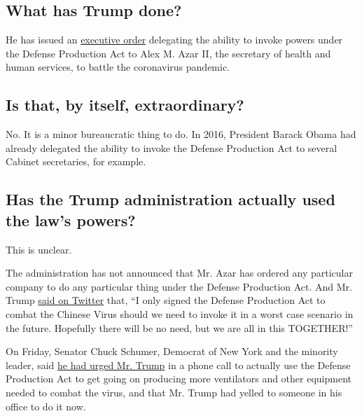 \hypertarget{what-has-trump-done}{%
\subsection{What has Trump done?}\label{what-has-trump-done}}

He has issued an
\href{https://www.whitehouse.gov/presidential-actions/executive-order-prioritizing-allocating-health-medical-resources-respond-spread-covid-19/}{executive
order} delegating the ability to invoke powers under the Defense
Production Act to Alex M. Azar II, the secretary of health and human
services, to battle the coronavirus pandemic.

\hypertarget{is-that-by-itself-extraordinary}{%
\subsection{Is that, by itself,
extraordinary?}\label{is-that-by-itself-extraordinary}}

No. It is a minor bureaucratic thing to do. In 2016, President Barack
Obama had already delegated the ability to invoke the Defense Production
Act to several Cabinet secretaries, for example.

\hypertarget{has-the-trump-administration-actually-used-the-laws-powers}{%
\subsection{Has the Trump administration actually used the law's
powers?}\label{has-the-trump-administration-actually-used-the-laws-powers}}

This is unclear.

The administration has not announced that Mr. Azar has ordered any
particular company to do any particular thing under the Defense
Production Act. And Mr. Trump
\href{https://twitter.com/realDonaldTrump/status/1240391871026864130}{said
on Twitter} that, ``I only signed the Defense Production Act to combat
the Chinese Virus should we need to invoke it in a worst case scenario
in the future. Hopefully there will be no need, but we are all in this
TOGETHER!''

On Friday, Senator Chuck Schumer, Democrat of New York and the minority
leader, said
\href{https://www.nytimes3xbfgragh.onion/2020/03/20/us/politics/trump-coronavirus-supplies.html}{he
had urged Mr. Trump} in a phone call to actually use the Defense
Production Act to get going on producing more ventilators and other
equipment needed to combat the virus, and that Mr. Trump had yelled to
someone in his office to do it now.


